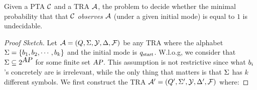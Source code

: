 %
\begin{theorem}\label{thm:traundecidability}
Given a PTA $\mathcal{C}$ and a TRA $\mathcal{A}$, the problem to decide whether the minimal probability that
that $\mathcal{C}$ \emph{observes} $\mathcal{A}$ (under a given initial mode) is equal to $1$ is undecidable.
\end{theorem}
%
\begin{proof}[Proof Sketch]
Let $\mathcal{A}=(Q,\Sigma,\mathcal{Y},\Delta,\mathcal{F})$ be any TRA where the alphabet $\Sigma = \{b_{1}, b_{2}, \cdots, b_{k}\}$ and the initial mode is $q_{\mbox{\sl\scriptsize start}}$.
W.l.o.g, we consider that $\Sigma\subseteq 2^{\mbox{\sl AP}}$ for some finite set $\mbox{\sl AP}$.
This assumption is not restrictive since what $b_{i}$'s concretely are is irrelevant, while the only thing that matters is that $\Sigma$ has $k$ different symbols.
We first construct the TRA $\mathcal{A}' = (Q', \Sigma', \mathcal{Y}, \Delta',\mathcal{F})$ where:


\end{proof}
